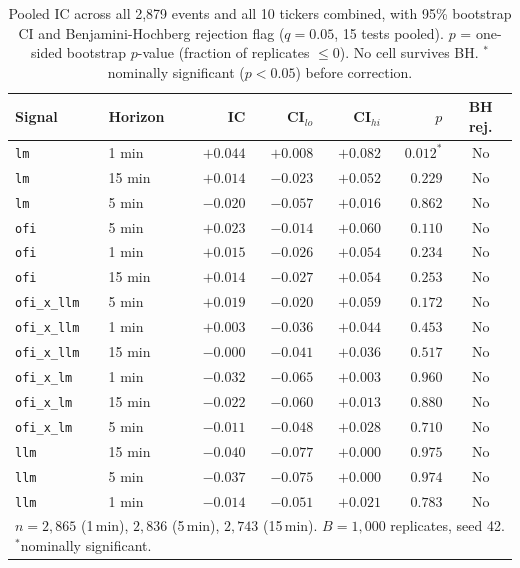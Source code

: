 \documentclass[11pt, letterpaper]{article}
\begin{document}
\begin{table}[h]
\centering
\small
\caption{Pooled IC across all 2,879 events and all 10 tickers combined, with 95\%
bootstrap CI and Benjamini-Hochberg rejection flag ($q = 0.05$, 15 tests pooled).
$p$ = one-sided bootstrap $p$-value (fraction of replicates $\leq 0$). No cell
survives BH. $^*$ nominally significant ($p < 0.05$) before correction.}
\label{tab:ic_pooled}
\begin{tabular}{llrrrrc}
\toprule
Signal & Horizon & IC & CI$_{lo}$ & CI$_{hi}$ & $p$ & BH rej. \\
\midrule
\texttt{lm}          & 1 min  & $+0.044$ & $+0.008$ & $+0.082$ & $0.012^*$ & No \\
\texttt{lm}          & 15 min & $+0.014$ & $-0.023$ & $+0.052$ & $0.229$   & No \\
\texttt{lm}          & 5 min  & $-0.020$ & $-0.057$ & $+0.016$ & $0.862$   & No \\
\texttt{ofi}         & 5 min  & $+0.023$ & $-0.014$ & $+0.060$ & $0.110$   & No \\
\texttt{ofi}         & 1 min  & $+0.015$ & $-0.026$ & $+0.054$ & $0.234$   & No \\
\texttt{ofi}         & 15 min & $+0.014$ & $-0.027$ & $+0.054$ & $0.253$   & No \\
\texttt{ofi\_x\_llm} & 5 min  & $+0.019$ & $-0.020$ & $+0.059$ & $0.172$   & No \\
\texttt{ofi\_x\_llm} & 1 min  & $+0.003$ & $-0.036$ & $+0.044$ & $0.453$   & No \\
\texttt{ofi\_x\_llm} & 15 min & $-0.000$ & $-0.041$ & $+0.036$ & $0.517$   & No \\
\texttt{ofi\_x\_lm}  & 1 min  & $-0.032$ & $-0.065$ & $+0.003$ & $0.960$   & No \\
\texttt{ofi\_x\_lm}  & 15 min & $-0.022$ & $-0.060$ & $+0.013$ & $0.880$   & No \\
\texttt{ofi\_x\_lm}  & 5 min  & $-0.011$ & $-0.048$ & $+0.028$ & $0.710$   & No \\
\texttt{llm}         & 15 min & $-0.040$ & $-0.077$ & $+0.000$ & $0.975$   & No \\
\texttt{llm}         & 5 min  & $-0.037$ & $-0.075$ & $+0.000$ & $0.974$   & No \\
\texttt{llm}         & 1 min  & $-0.014$ & $-0.051$ & $+0.021$ & $0.783$   & No \\
\bottomrule
\multicolumn{7}{l}{\footnotesize $n = 2{,}865$ (1\,min), $2{,}836$ (5\,min), $2{,}743$ (15\,min).
$B = 1{,}000$ replicates, seed 42. $^*$nominally significant.}
\end{tabular}
\end{table}
\end{document}
